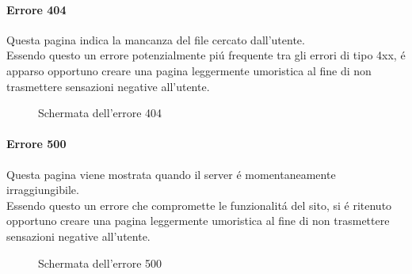 \documentclass{article}
\begin{document}
\paragraph*{Errore 404}
Questa pagina indica la mancanza del file cercato dall'utente.\\
Essendo questo un errore potenzialmente piú frequente tra gli errori di tipo 4xx, é apparso opportuno creare una pagina leggermente umoristica al fine di non trasmettere sensazioni negative all'utente.
\begin{figure}[H]
	\centering
	\caption{Schermata dell'errore 404}
\end{figure}
\paragraph*{Errore 500}
Questa pagina viene mostrata quando il server é momentaneamente irraggiungibile.\\
Essendo questo un errore che compromette le funzionalitá del sito, si é ritenuto opportuno creare una pagina leggermente umoristica al fine di non trasmettere sensazioni negative all'utente.
\begin{figure}[H]
	\centering
	\caption{Schermata dell'errore 500}
\end{figure}
\end{document}
